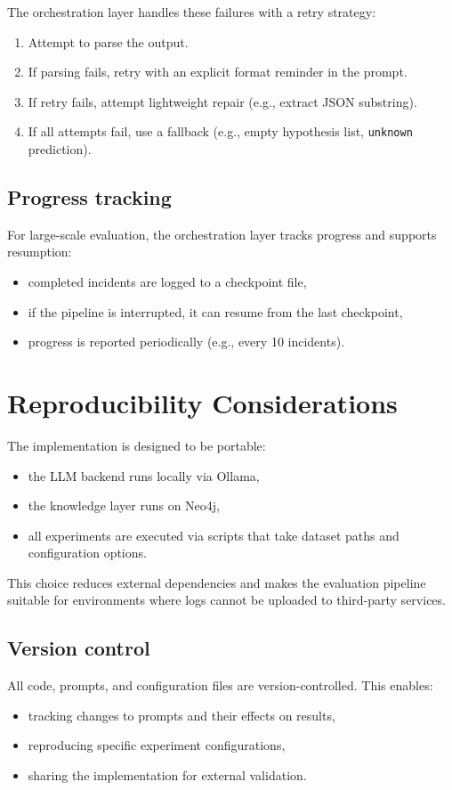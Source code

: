The orchestration layer handles these failures with a retry strategy:
\begin{enumerate}
  \item Attempt to parse the output.
  \item If parsing fails, retry with an explicit format reminder in the prompt.
  \item If retry fails, attempt lightweight repair (e.g., extract JSON substring).
  \item If all attempts fail, use a fallback (e.g., empty hypothesis list, \texttt{unknown}
        prediction).
\end{enumerate}

\subsection{Progress tracking}
For large-scale evaluation, the orchestration layer tracks progress and supports resumption:
\begin{itemize}
  \item completed incidents are logged to a checkpoint file,
  \item if the pipeline is interrupted, it can resume from the last checkpoint,
  \item progress is reported periodically (e.g., every 10 incidents).
\end{itemize}

\section{Reproducibility Considerations}
The implementation is designed to be portable:
\begin{itemize}
  \item the LLM backend runs locally via Ollama,
  \item the knowledge layer runs on Neo4j,
  \item all experiments are executed via scripts that take dataset paths and configuration
        options.
\end{itemize}
This choice reduces external dependencies and makes the evaluation pipeline suitable for
environments where logs cannot be uploaded to third-party services.

\subsection{Version control}
All code, prompts, and configuration files are version-controlled. This enables:
\begin{itemize}
  \item tracking changes to prompts and their effects on results,
  \item reproducing specific experiment configurations,
  \item sharing the implementation for external validation.
\end{itemize}

